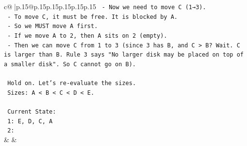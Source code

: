 \documentclass{article}
\begin{document}
{\begin{supertabular}{c@{$\;$}|p{.15\linewidth}@{}p{.15\linewidth}p{.15\linewidth}p{.15\linewidth}p{.15\linewidth}p{.15\linewidth}}
{{{\texttt{     {-} Now we need to move C (1→3).} \\
\texttt{     {-} To move C, it must be free. It is blocked by A.} \\
\texttt{     {-} So we MUST move A first.} \\
\texttt{     {-} If we move A to 2, then A sits on 2 (empty).} \\
\texttt{     {-} Then we can move C from 1 to 3 (since 3 has B, and C > B? Wait. C is larger than B. Rule 3 says "No larger disk may be placed on top of a smaller disk". So C cannot go on B).} \\
\\ 
\texttt{   Hold on. Let's re{-}evaluate the sizes.} \\
\texttt{   Sizes: A < B < C < D < E.} \\
\\ 
\texttt{   Current State:} \\
\texttt{   1: E, D, C, A} \\
\texttt{   2:} \\
            }
        }
    }
    & & \\ \\


\end{supertabular}}
\end{document}

